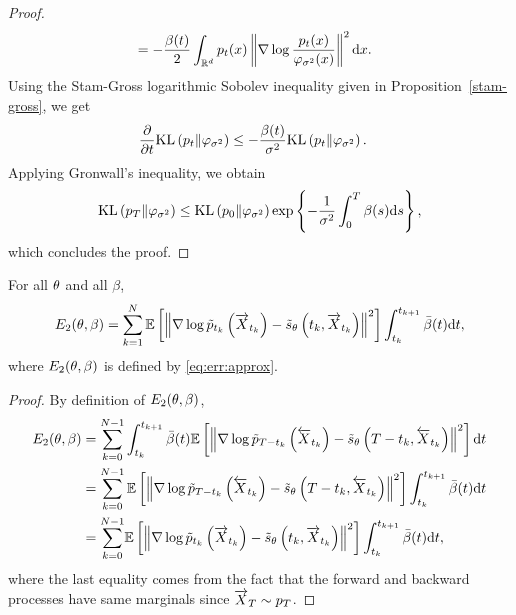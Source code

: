 \documentclass[english,graybox,envcountchap,envcountsame,sectrefs,shortlabels]{svmono}
\theoremstyle{style}
\newcommand{\eqsp}{}
\newcommand{\kl}{\mathrm{KL}}
\begin{document}
\begin{proof}
\begin{align*}
    &= - \frac{\sched(t)}{2} \int_{\mathbb{R}^d} p_t(x) \left\| \nabla \log \frac{p_t(x)}{\gausspdf_{\sigma^2}(x)} \right\|^2 \rmd x\eqsp.
\end{align*}
Using the Stam-Gross logarithmic Sobolev inequality given in  Proposition~\ref{stam-gross}, we get
\begin{align*}
    \frac{\partial}{ \partial t} \kl \left( p_t \|\gausspdf_{\sigma^2}  \right)
    & \leq - \frac{ \sched(t)}{\sigma^2} \kl \left( p_t \|\gausspdf_{\sigma^2}  \right)\eqsp.
\end{align*}
Applying Gronwall's inequality, we obtain
\begin{align*}
    \kl \left( p_T \|\gausspdf_{\sigma^2} \right) \leq \kl \left( p_0 \|\gausspdf_{\sigma^2} \right) \exp\left\{- \frac{1}{\sigma^2} \int_0^T \sched(s) \rmd s\right\}\eqsp, 
\end{align*}
which concludes the proof.
\end{proof}


\begin{lemma}
\label{lem:approx}
For all $\theta$ and all $\beta$,
\begin{align*}
    E_2(\param,\sched) = \sum_{k = 1}^{N}  \mathbb{E} \left[  \left\|   \nabla \log \tilde p_{t_k}\left(\ora X_{t_k}\right) - \tilde s_{\param}\left(t_k, \ora X_{t_k}\right) \right\|^2 \right] \int_{t_k}^{t_{k+1}} \bar \sched (t) \rmd t\eqsp,
\end{align*}
    where $E_2(\theta,\beta)$ is defined by \eqref{eq:err:approx}.
\end{lemma}

\begin{proof}
By definition of $E_2(\theta,\beta)$,
\begin{align*}
  E_2(\param,\sched) & = \sum_{k = 0}^{N-1} \int_{t_k}^{t_{k+1}} \bar \sched (t) \mathbb{E} \left[  \left\|   \nabla \log \tilde p_{T-t_k}\left(\ola X_{t_k}\right) - \tilde s_{\param}\left(T - t_k, \ola X_{t_k} \right) \right\|^2 \right] \rmd t \\
  & = \sum_{k = 0}^{N-1}  \mathbb{E} \left[  \left\|   \nabla \log \tilde p_{T-t_k}\left(\ola X_{t_k}\right) - \tilde s_{\param}\left(T - t_k, \ola X_{t_k} \right) \right\|^2 \right] \int_{t_k}^{t_{k+1}} \bar \sched (t) \rmd t \\
  & ={\sum_{k = 0}^{N-1}} \mathbb{E} \left[  \left\|   \nabla \log \tilde p_{t_k}\left(\ora X_{t_k}\right) - \tilde s_{\param}\left(t_k, \ora X_{t_k}\right) \right\|^2 \right] \int_{t_k}^{t_{k+1}} \bar \sched (t) \rmd t\eqsp,%
\end{align*}
where the last equality comes from the fact that the forward and backward processes have same marginals since $ \overrightarrow X_{T} \sim  p_T$.
\end{proof}
\end{document}

